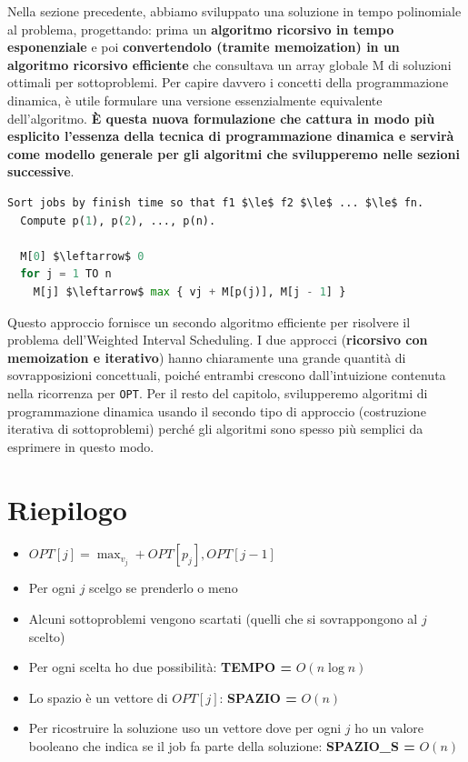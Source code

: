 Nella sezione precedente, abbiamo sviluppato una soluzione in tempo
polinomiale al problema, progettando: prima un \textbf{algoritmo
  ricorsivo in tempo esponenziale} e poi \textbf{convertendolo (tramite
  memoization) in un algoritmo ricorsivo efficiente} che consultava un
array globale M di soluzioni ottimali per sottoproblemi. Per capire
davvero i concetti della programmazione dinamica, è utile formulare una
versione essenzialmente equivalente dell'algoritmo. \textbf{È questa
  nuova formulazione che cattura in modo più esplicito l'essenza della
  tecnica di programmazione dinamica e servirà come modello generale per
  gli algoritmi che svilupperemo nelle sezioni successive}.

\begin{lstlisting}[language=Python, mathescape=true]
Sort jobs by finish time so that f1 $\le$ f2 $\le$ ... $\le$ fn. 
  Compute p(1), p(2), ..., p(n).
  
  M[0] $\leftarrow$ 0
  for j = 1 TO n
    M[j] $\leftarrow$ max { vj + M[p(j)], M[j - 1] }
\end{lstlisting}

Questo approccio fornisce un secondo algoritmo efficiente per risolvere
il problema dell'Weighted Interval Scheduling. I due approcci
(\textbf{ricorsivo con memoization e iterativo}) hanno chiaramente una
grande quantità di sovrapposizioni concettuali, poiché entrambi crescono
dall'intuizione contenuta nella ricorrenza per \texttt{OPT}. Per il
resto del capitolo, svilupperemo algoritmi di programmazione dinamica
usando il secondo tipo di approccio (costruzione iterativa di
sottoproblemi) perché gli algoritmi sono spesso più semplici da
esprimere in questo modo.

\section{Riepilogo}

\begin{itemize}
  \item
        $OPT[j] = \max_{v_j}+OPT[p_j],OPT[j-1]$
  \item
        Per ogni $j$ scelgo se prenderlo o meno
  \item
        Alcuni sottoproblemi vengono scartati (quelli che si sovrappongono al
        $j$ scelto)
  \item
        Per ogni scelta ho due possibilità: \textbf{TEMPO =} $O(n \log n)$
  \item
        Lo spazio è un vettore di $OPT[j]$: \textbf{SPAZIO =} $O(n)$
  \item
        Per ricostruire la soluzione uso un vettore dove per ogni $j$ ho un
        valore booleano che indica se il job fa parte della soluzione:
        \textbf{SPAZIO\_S =} $O(n)$
\end{itemize}
